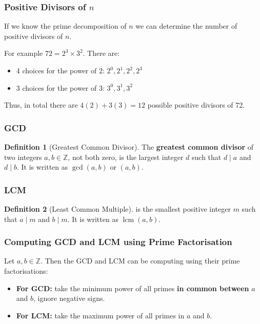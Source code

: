 \documentclass[12pt]{article}
\newcommand{\Z}{\mathbb{Z}}
\theoremstyle{definition}
\newtheorem{definition}{Definition}
\DeclareMathOperator{\lcm}{lcm}
\begin{document}
    \subsubsection{Positive Divisors of $n$}
    If we know the prime decomposition of $n$ we can determine the number of positive 
    divisors of $n$.

    For example $72 = 2^3 \times  3^2$. There are:
    \begin{itemize}
        \item 4 choices for the power of 2: $2^0, 2^1, 2^2, 2^3$
        \item 3 choices for the power of 3: $3^0, 3^1, 3^2$
    \end{itemize}
    Thus, in total there are $4(2) + 3(3) = 12$ possible positive divisors of 72.

    \subsubsection{GCD}
    \begin{definition}[Greatest Common Divisor]
        \label{def:greatest-common-divisor}
        The \textbf{greatest common divisor} of two integers $a,b \in \Z$, not both zero,
        is the largest integer $d$ such that $d \mid a$ and $d \mid b$. It is written as
        $\gcd(a,b)$ or $(a,b)$.
    \end{definition}

    \subsubsection{LCM}
    \begin{definition}[Least Common Multiple]
        \label{def:least-common-multiple}
        is the smallest positive integer $m$ such that $a \mid m$ and $b \mid m$. It is written as
        $\lcm(a,b)$.
    \end{definition}

    \subsubsection{Computing GCD and LCM using Prime Factorisation}
    Let $a, b \in \Z$. Then the GCD and LCM can be computing using their prime factorisations:
    \begin{itemize}
        \item \textbf{For GCD:} take the minimum power of all primes \textbf{in common between}
        $a$ and $b$, ignore negative signs.
        \item \textbf{For LCM:} take the maximum power of all primes in $a$ and $b$.
    \end{itemize}
\end{document}
